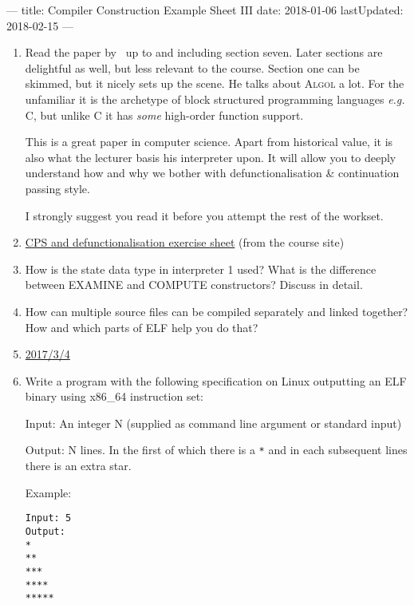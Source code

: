 ---
title: Compiler Construction Example Sheet III
date: 2018-01-06
lastUpdated: 2018-02-15
---



\begin{enumerate}
  \item Read the paper by~\citet{reynolds1972definitional} up to and including
    section seven. Later sections are delightful as well, but less relevant to
    the course. Section one can be skimmed, but it nicely sets up the scene. He
    talks about \textsc{Algol} a lot. For the unfamiliar it is the archetype of
    block structured programming languages \emph{e.g.} \textsc{C}, but unlike
    \textsc{C} it has \emph{some} high-order function support.

    This is a great paper in computer science. Apart from historical value, it
    is also what the lecturer basis his interpreter upon. It will allow you to
    deeply understand how and why we bother with defunctionalisation \&
    continuation passing style.

    I strongly suggest you read it before you attempt the rest of the workset.

  \item
    \href{https://www.cl.cam.ac.uk/teaching/current/CompConstr/exercises_cps.ml}{CPS
    and defunctionalisation exercise sheet} (from the course site)

  \item How is the state data type in interpreter 1 used? What is the
    difference between EXAMINE and COMPUTE constructors? Discuss in detail.

  \item How can multiple source files can be compiled separately and linked
    together? How and which parts of ELF help you do that?

  \item \href{http://www.cl.cam.ac.uk/teaching/exams/pastpapers/y2017p23q4.pdf}{2017/3/4}

  \item Write a program with the following specification on Linux outputting an
    ELF binary using x86\_64 instruction set:

    Input: An integer N (supplied as command line argument or standard input)

    Output: N lines. In the first of which there is a \texttt{*} and in each
    subsequent lines there is an extra star.

    Example:
    \begin{verbatim}
Input: 5
Output:
*
**
***
****
*****
    \end{verbatim}

\end{enumerate}


